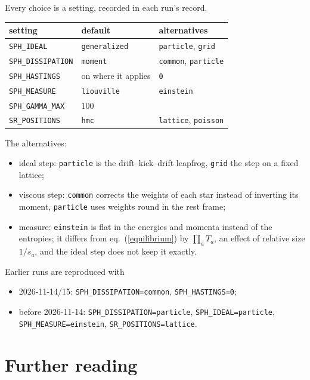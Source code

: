 \documentclass[11pt,aps,preprint,nofootinbib,superscriptaddress,tightenlines]{revtex4-2}
\def\Eq#1{eq.~(\ref{#1})}
\begin{document}
Every choice is a setting, recorded in each run's record.
\begin{center}
\begin{tabular}{lll}
\toprule
setting & default & alternatives \\ \midrule
\texttt{SPH\_IDEAL} & \texttt{generalized} & \texttt{particle}, \texttt{grid} \\
\texttt{SPH\_DISSIPATION} & \texttt{moment} & \texttt{common}, \texttt{particle} \\
\texttt{SPH\_HASTINGS} & on where it applies & \texttt{0} \\
\texttt{SPH\_MEASURE} & \texttt{liouville} & \texttt{einstein} \\
\texttt{SPH\_GAMMA\_MAX} & $100$ & \\
\texttt{SR\_POSITIONS} & \texttt{hmc} & \texttt{lattice}, \texttt{poisson} \\
\bottomrule
\end{tabular}
\end{center}
The alternatives:
\begin{itemize}
\item ideal step: \texttt{particle} is the drift--kick--drift leapfrog, \texttt{grid} the step on a fixed lattice;
\item viscous step: \texttt{common} corrects the weights of each star instead of inverting its moment, \texttt{particle} uses weights round in
  the rest frame;
\item measure: \texttt{einstein} is flat in the energies and momenta instead of the entropies; it differs from \Eq{equilibrium} by $\prod_aT_a$, an
  effect of relative size $1/s_a$, and the ideal step does not keep it exactly.
\end{itemize}
Earlier runs are reproduced with
\begin{itemize}
\item 2026-11-14/15: \texttt{SPH\_DISSIPATION=common}, \texttt{SPH\_HASTINGS=0};
\item before 2026-11-14: \texttt{SPH\_DISSIPATION=particle}, \texttt{SPH\_IDEAL=particle},\\
  \texttt{SPH\_MEASURE=einstein}, \texttt{SR\_POSITIONS=lattice}.
\end{itemize}

\section{Further reading}
\label{app:reading}
\end{document}
